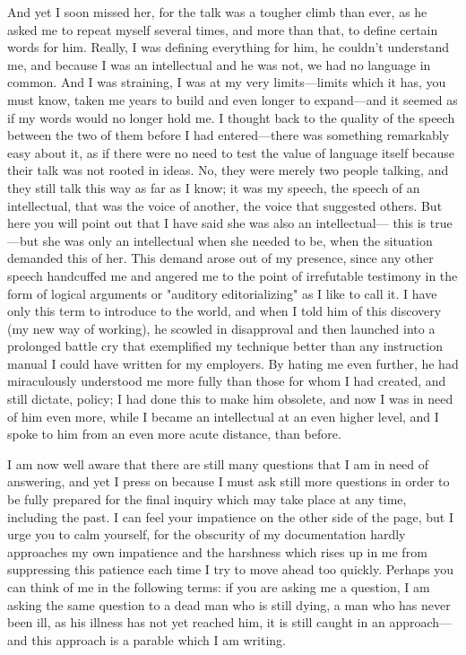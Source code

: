 \documentclass[
]{memoir}
\begin{document}
And yet I soon missed her, for the talk was a tougher climb than ever,
as he asked me to repeat myself several times, and more than that, to
define certain words for him. Really, I was defining everything for him,
he couldn't understand me, and because I was an intellectual and he was
not, we had no language in common. And I was straining, I was at my very
limits---limits which it has, you must know, taken me years to build and
even longer to expand---and it seemed as if my words would no longer
hold me. I thought back to the quality of the speech between the two of
them before I had entered---there was something remarkably easy about
it, as if there were no need to test the value of language itself
because their talk was not rooted in ideas. No, they were merely two
people talking, and they still talk this way as far as I know; it was my
speech, the speech of an intellectual, that was the voice of another,
the voice that suggested others. But here you will point out that I have
said she was also an intellectual--- this is true---but she was only an
intellectual when she needed to be, when the situation demanded this of
her. This demand arose out of my presence, since any other speech
handcuffed me and angered me to the point of irrefutable testimony in
the form of logical arguments or "auditory editorializing" as I like to
call it. I have only this term to introduce to the world, and when I
told him of this discovery (my new way of working), he scowled in
disapproval and then launched into a prolonged battle cry that
exemplified my technique better than any instruction manual I could have
written for my employers. By hating me even further, he had miraculously
understood me more fully than those for whom I had created, and still
dictate, policy; I had done this to make him obsolete, and now I was in
need of him even more, while I became an intellectual at an even higher
level, and I spoke to him from an even more acute distance, than before.

I am now well aware that there are still many questions that I am in
need of answering, and yet I press on because I must ask still more
questions in order to be fully prepared for the final inquiry which may
take place at any time, including the past. I can feel your impatience
on the other side of the page, but I urge you to calm yourself, for the
obscurity of my documentation hardly approaches my own impatience and
the harshness which rises up in me from suppressing this patience each
time I try to move ahead too quickly. Perhaps you can think of me in the
following terms: if you are asking me a question, I am asking the same
question to a dead man who is still dying, a man who has never been ill,
as his illness has not yet reached him, it is still caught in an
approach---and this approach is a parable which I am writing.
\end{document}
